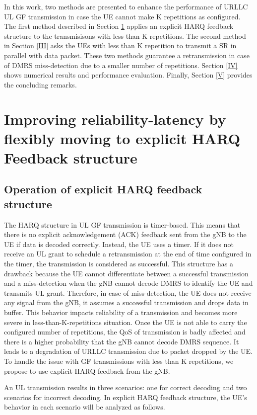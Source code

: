 \documentclass[conference]{IEEEtran}
\begin{document}
In this work, two methods are presented to enhance the performance of URLLC UL GF transmission in case the UE cannot make K repetitions as configured. The first method described in Section \ref{II} applies an explicit HARQ feedback structure to the transmisisons with less than K repetitions. The second method in Section \ref{III} asks the UEs with less than K repetition to transmit a SR in parallel with data packet. These two methods guarantee a retransmission in case of DMRS miss-detection due to a smaller number of repetitions. Section \ref{IV} shows numerical results and performance evaluation. Finally, Section \ref{V} provides the concluding remarks.

\section{Improving reliability-latency by flexibly moving to explicit HARQ Feedback structure}\label{II}

\subsection{Operation of explicit HARQ feedback structure}\label{IIAA}

The HARQ structure in UL GF transmission is timer-based. This means that there is no explicit acknowledgement (ACK) feedback sent from the gNB to the UE if data is decoded correctly. Instead, the UE uses a timer. If it does not receive an UL grant to schedule a retransmission at the end of time configured in the timer, the transmission is considered as successful. This structure has a drawback because the UE cannot differentiate between a successful transmission and a miss-detection when the gNB cannot decode DMRS to identify the UE and transmits UL grant. Therefore, in case of miss-detection, the UE does not receive any signal from the gNB, it assumes a successful transmission and drops data in buffer. This behavior impacts reliability of a transmission and becomes more severe in less-than-K-repetitions situation. Once the UE is not able to carry the configured number of repetitions, the QoS of transmission is badly affected and there is a higher probability that the gNB cannot decode DMRS sequence. It leads to a degradation of URLLC transmission due to packet dropped by the UE. To handle the issue with GF transmissions with less than K repetitions, we propose to use explicit HARQ feedback from the gNB. 

An UL transmission results in three scenarios: one for correct decoding and two scenarios for incorrect decoding. In explicit HARQ feedback structure, the UE's behavior in each scenario will be analyzed as follows. 
\end{document}

